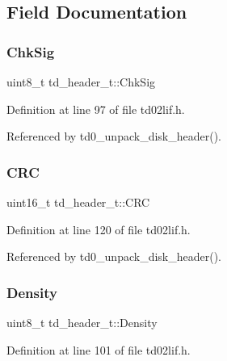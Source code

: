 \subsection{Field Documentation}
\mbox{\label{structtd__header__t_ad226c52f8f8481b0ebf826dd3128ba3d}} 
\subsubsection{\texorpdfstring{Chk\+Sig}{ChkSig}}
{\footnotesize\ttfamily uint8\+\_\+t td\+\_\+header\+\_\+t\+::\+Chk\+Sig}



Definition at line 97 of file td02lif.\+h.



Referenced by td0\+\_\+unpack\+\_\+disk\+\_\+header().

\mbox{\label{structtd__header__t_ae51197a200b65947359773f1aeea9c2d}} 
\subsubsection{\texorpdfstring{C\+RC}{CRC}}
{\footnotesize\ttfamily uint16\+\_\+t td\+\_\+header\+\_\+t\+::\+C\+RC}



Definition at line 120 of file td02lif.\+h.



Referenced by td0\+\_\+unpack\+\_\+disk\+\_\+header().

\mbox{\label{structtd__header__t_a09c0c52ec99733db61dd6f3c7d052325}} 
\subsubsection{\texorpdfstring{Density}{Density}}
{\footnotesize\ttfamily uint8\+\_\+t td\+\_\+header\+\_\+t\+::\+Density}



Definition at line 101 of file td02lif.\+h.



